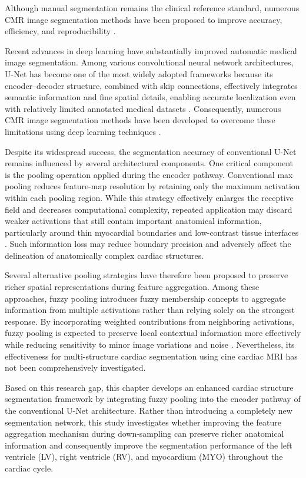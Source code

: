 Although manual segmentation remains the clinical reference standard, numerous CMR image segmentation methods have been proposed to improve accuracy, efficiency, and reproducibility \citep{Petitjean2011}.

Recent advances in deep learning have substantially improved automatic medical image segmentation. Among various convolutional neural network architectures, U-Net has become one of the most widely adopted frameworks because its encoder--decoder structure, combined with skip connections, effectively integrates semantic information and fine spatial details, enabling accurate localization even with relatively limited annotated medical datasets \citep{Ronneberger2015,Siddique2021}. Consequently, numerous CMR image segmentation methods have been developed to overcome these limitations using deep learning techniques \citep{Ronneberger2015,Siddique2021}.

Despite its widespread success, the segmentation accuracy of conventional U-Net remains influenced by several architectural components. One critical component is the pooling operation applied during the encoder pathway. Conventional max pooling reduces feature-map resolution by retaining only the maximum activation within each pooling region. While this strategy effectively enlarges the receptive field and decreases computational complexity, repeated application may discard weaker activations that still contain important anatomical information, particularly around thin myocardial boundaries and low-contrast tissue interfaces \citep{Nirthika2022,Diamantis2020}. Such information loss may reduce boundary precision and adversely affect the delineation of anatomically complex cardiac structures.

Several alternative pooling strategies have therefore been proposed to preserve richer spatial representations during feature aggregation. Among these approaches, fuzzy pooling introduces fuzzy membership concepts to aggregate information from multiple activations rather than relying solely on the strongest response. By incorporating weighted contributions from neighboring activations, fuzzy pooling is expected to preserve local contextual information more effectively while reducing sensitivity to minor image variations and noise \citep{Diamantis2020}. Nevertheless, its effectiveness for multi-structure cardiac segmentation using cine cardiac MRI has not been comprehensively investigated.

Based on this research gap, this chapter develops an enhanced cardiac structure segmentation framework by integrating fuzzy pooling into the encoder pathway of the conventional U-Net architecture. Rather than introducing a completely new segmentation network, this study investigates whether improving the feature aggregation mechanism during down-sampling can preserve richer anatomical information and consequently improve the segmentation performance of the left ventricle (LV), right ventricle (RV), and myocardium (MYO) throughout the cardiac cycle.

